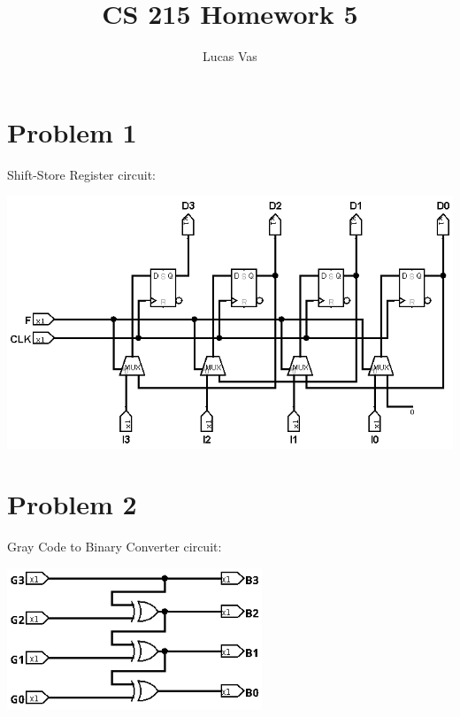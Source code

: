 \documentclass[12pt]{article}
\title{CS 215 Homework 5}
\author{Lucas Vas}
\begin{document}
\maketitle

\section*{Problem 1}

Shift-Store Register circuit:
\begin{center}
\includegraphics[width=6in]{ShiftStoreReg}
\end{center}

\clearpage

\section*{Problem 2}

Gray Code to Binary Converter circuit:
\begin{center}
\includegraphics[width=3in]{GC2BIN}
\end{center}
\end{document}
